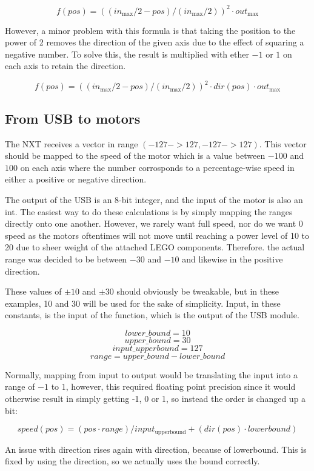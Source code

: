 $$
f(pos) = ((in_\text{max}/2 - pos)/(in_\text{max}/2))^2 \cdot out_\text{max}
$$

However, a minor problem with this formula is that taking the position to the power of 2 removes the direction of the given axis due to the effect of squaring a negative number.
To solve this, the result is multiplied with ether $-1$ or $1$ on each axis to retain the direction.

$$
f(pos) = ((in_\text{max}/2 - pos)/(in_\text{max}/2))^2 \cdot dir(pos) \cdot out_\text{max}
$$

\subsection{From USB to motors}
The NXT receives a vector in range $(-127 -> 127, -127 -> 127)$.
This vector should be mapped to the speed of the motor which is a value between $-100$ and $100$ on each axis where the number corrosponds to a percentage-wise speed in either a positive or negative direction.

The output of the USB is an 8-bit integer, and the input of the motor is also an int.
The easiest way to do these calculations is by simply mapping the ranges directly onto one another.
However, we rarely want full speed, nor do we want 0 speed as the motors oftentimes will not move until reaching a power level of 10 to 20 due to sheer weight of the attached LEGO components.
Therefore. the actual range was decided to be between $-30$ and $-10$ and likewise in the positive direction.

These values of $\pm10$ and $\pm30$ should obviously be tweakable, but in these examples, 10 and 30 will be used for the sake of simplicity. 
Input, in these constants, is the input of the function, which is the output of the USB module.

	$$lower\_bound = 10$$
	$$upper\_bound = 30$$
	$$input\_upperbound = 127$$
	$$range = upper\_bound - lower\_bound$$

Normally, mapping from input to output would be translating the input into a range of $-1$ to $1$, however, this required floating point precision since it would otherwise result in simply getting -1, 0 or 1, so instead the order is changed up a bit:

$$
speed(pos) = (pos \cdot range)/input_\text{upperbound} + (dir(pos) \cdot lowerbound)
$$

An issue with direction rises again with direction, because of lowerbound.
This is fixed by using the direction, so we actually uses the bound correctly. 